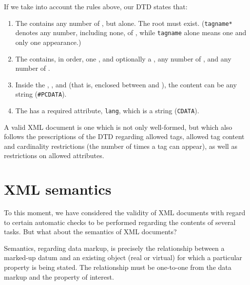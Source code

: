		If we take into account the rules above, our DTD states
		that:
		
		\begin{enumerate}
			\item The  contains any number of
			, but  alone. The root
			 must exist. (\texttt{tagname*} denotes
			any number, including none, of , while
			\texttt{tagname} alone means one and only one
			 appearance.)
			
			 \item The  contains, in order, one
			, and optionally a ,
			any number of , and any number of
			.
			
			 \item Inside the , ,
			 and  (that is,
			enclosed between  and ), the
			content can be any string (\texttt{\#PCDATA}).
			
			 \item The  has a required attribute,
			\texttt{lang}, which is a string (\texttt{CDATA}).
		\end{enumerate}
		
		A valid XML document is one which is not only well-formed,
		but which also follows the prescriptions of the DTD
		regarding allowed tags, allowed tag content and cardinality
		restrictions (the number of times a tag can appear), as
		well as restrictions on allowed attributes.
		
	
	\section{XML semantics} %
	\label{sec:xml_semantics}
		
		To this moment, we have considered the validity of XML
		documents with regard to certain automatic checks to be
		performed regarding the contents of several tasks. But what
		about the semantics of XML documents?
		
		 Semantics, regarding data markup, is precisely the
		relationship between a marked-up datum and an existing
		object (real or virtual) for which a particular property is
		being stated. The relationship must be one-to-one from the
		data markup and the property of interest.
		
